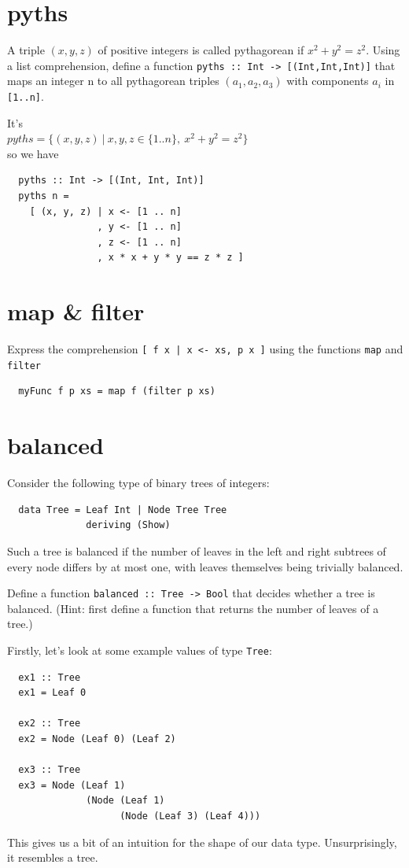 \documentclass[tikz,border=10pt]{project_plan}
\begin{document}
\section{pyths}

A triple $(x,y,z)$ of positive integers is called pythagorean if $x^2 + y^2 = z^2$. Using
a list comprehension, define a function
\lstinline?pyths :: Int -> [(Int,Int,Int)]?
that maps an integer n to all pythagorean triples $(a_1, a_2, a_3)$ with components
$a_i$ in \lstinline?[1..n]?.

It's\\
$pyths = \{(x, y, z)\ |\ x, y, z \in \{1..n\},\ x^2 + y^2 = z^2\}$\\
so we have
\begin{lstlisting}
  pyths :: Int -> [(Int, Int, Int)]
  pyths n =
    [ (x, y, z) | x <- [1 .. n]
                , y <- [1 .. n]
                , z <- [1 .. n]
                , x * x + y * y == z * z ]
\end{lstlisting}

\section{map \& filter}

Express the comprehension \lstinline?[ f x | x <- xs, p x ]? using the functions \lstinline?map?
and \lstinline?filter?

\begin{lstlisting}
  myFunc f p xs = map f (filter p xs)
\end{lstlisting}

\section{balanced}

Consider the following type of binary trees of integers:
\begin{lstlisting}
  data Tree = Leaf Int | Node Tree Tree
              deriving (Show)
\end{lstlisting}
Such a tree is balanced if the number of leaves in the left and right subtrees
of every node differs by at most one, with leaves themselves being trivially
balanced.

Define a function \lstinline?balanced :: Tree -> Bool? that decides whether a tree
is balanced. (Hint: first define a function that returns the number of leaves of
a tree.)

Firstly, let’s look at some example values of type \lstinline?Tree?:
\begin{lstlisting}
  ex1 :: Tree
  ex1 = Leaf 0

  ex2 :: Tree
  ex2 = Node (Leaf 0) (Leaf 2)

  ex3 :: Tree
  ex3 = Node (Leaf 1)
              (Node (Leaf 1)
                    (Node (Leaf 3) (Leaf 4)))
\end{lstlisting}
This gives us a bit of an intuition for the shape of our data type. Unsurprisingly,
it resembles a tree.
\end{document}
